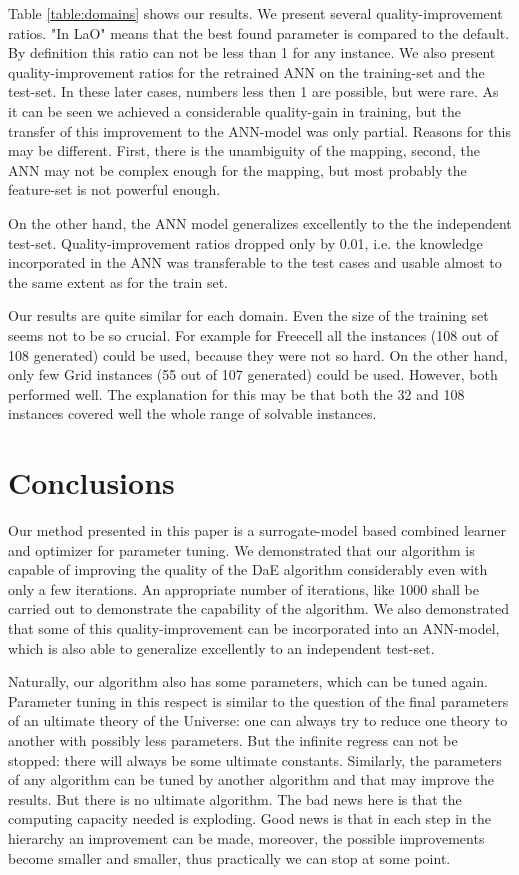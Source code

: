 \documentclass{MYsig-alternate}
\begin{document}
Table \ref{table:domains} shows our results. We present several quality-improvement ratios. "In LaO" means that the best found parameter is compared to the default. By definition this ratio can not be less than 1 for any instance. We also present quality-improvement ratios for the retrained ANN on the training-set and the test-set. In these later cases, numbers less then 1 are possible, but were rare. As it can be seen we achieved a considerable quality-gain in training, but the transfer of this improvement to the ANN-model was only partial. Reasons for this may be different. First, there is the unambiguity of the mapping, second, the ANN may not be complex enough for the mapping, but most probably the feature-set is not powerful enough. 

On the other hand, the ANN model generalizes excellently to the the independent test-set. Quality-improvement ratios dropped only by 0.01, i.e. the knowledge incorporated in the ANN was transferable to the test cases and usable almost to the same extent as for the train set.

Our results are quite similar for each domain. Even the size of the training set seems not to be so crucial. For example for Freecell all the instances (108 out of 108 generated) could be used, because they were not so hard. On the other hand, only few  Grid instances (55 out of 107 generated) could be used. However, both performed well. The explanation for this may be that both the 32 and 108 instances covered well the whole range of solvable instances.

\section{Conclusions}
\label{section:conclusions}

Our method presented in this paper is a surrogate-model based combined learner and optimizer for parameter tuning. We demonstrated that our algorithm is capable of improving the quality of the DaE algorithm considerably even with only a few iterations. An appropriate number of iterations, like 1000 shall be carried out to demonstrate the capability of the algorithm. We also demonstrated that some of this quality-improvement can be incorporated into an ANN-model, which is also able to generalize excellently to an independent test-set.

Naturally, our algorithm also has some parameters, which can be tuned again. Parameter tuning in this respect is similar to the question of the final parameters of an ultimate theory of the Universe: one can always try to reduce one theory to another with possibly less parameters. But the infinite regress can not be stopped: there will always be some ultimate constants. Similarly, the parameters of any algorithm can be tuned by another algorithm and that may improve the results. But there is no ultimate algorithm. The bad news here is that the computing capacity needed is exploding. Good news is that in each step in the hierarchy an improvement can be made, moreover, the possible improvements become smaller and smaller, thus practically we can stop at some point. 
\end{document}
